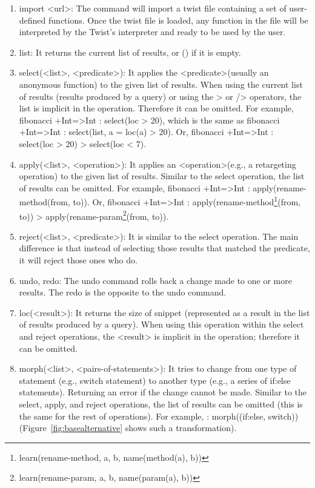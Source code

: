 \begin{enumerate}
	\item import <url>: The command will import a twist file containing a set of 
	user-defined functions. Once the twist file is loaded, any function in the file will 
	be interpreted by the Twist's interpreter and ready to be used by the user.
	
	\item list: It returns the current list of results, or () if it is empty.
	
	\item select(<list>, <predicate>): It applies the <predicate>(usually an anonymous function) 
	to the given list of results. When using the current list of results (results produced by a 
	query) or using the > or /> operators, the list is implicit in the operation. Therefore it can 
	be omitted. For example, fibonacci +Int=>Int : select(loc > 20), which is the same as 
	fibonacci +Int=>Int : select(list, a = loc(a) > 20). Or, fibonacci +Int=>Int : select(loc > 
	20) > select(loc < 7).
	
	\item apply(<list>, <operation>): It applies an <operation>(e.g., a retargeting operation) 
	to the given list of results. Similar to the select operation, the list of results can be 
	omitted. For example, fibonacci +Int=>Int : apply(rename-method(from, to)). Or, fibonacci 
	+Int=>Int : apply(rename-method\footnote{learn(rename-method, a, b, name(method(a), b))}(from, 
	to)) > apply(rename-param\footnote{learn(rename-param, a, b, name(param(a), b))}(from, to)).
		
	\item reject(<list>, <predicate>): It is similar to the select operation. The main difference 
	is that instead of selecting those results that matched the predicate, it will reject those 
	ones who do. 
	
	\item undo, redo: The undo command rolls back a change made to one or more results. 
	The redo is the opposite to the undo command.  
	
	\item loc(<result>): It returns the size of snippet (represented as a result in the 
	list of results produced by a query). When using this operation within the select and reject 
	operations, the <result> is implicit in the operation; therefore it can be omitted. 
	
	\item morph(<list>, <pairs-of-statements>): It tries to change from one type of statement 
	(e.g., switch statement) to another type (e.g., a series of if:else statements). Returning an 
	error if the change cannot be made. Similar to the select, apply, and reject operations, the 
	list of results can be omitted (this is the same for the rest of operations). For example, : 
	morph((if:else, switch)) (Figure~\ref{fig:basealternative} shows such a transformation).  
	

\end{enumerate}
